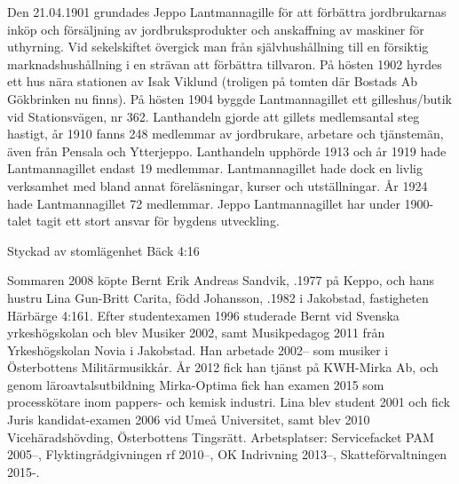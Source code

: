 Den 21.04.1901 grundades Jeppo Lantmannagille för att förbättra jordbrukarnas inköp och försäljning av jordbruksprodukter och anskaffning av maskiner för uthyrning. Vid sekelskiftet övergick man från självhushållning till en försiktig marknadshushållning i en strävan att förbättra tillvaron. På hösten 1902 hyrdes ett hus nära stationen av Isak Viklund	(troligen på tomten där Bostads Ab Gökbrinken nu finns). På hösten 1904 byggde Lantmannagillet ett gilleshus/butik vid Stationsvägen, nr 362. Lanthandeln gjorde att gillets medlemsantal steg hastigt, år 1910 fanns	248 medlemmar av jordbrukare, arbetare och tjänstemän, även från 	Pensala och Ytterjeppo. Lanthandeln upphörde 1913 och år 1919 hade 	Lantmannagillet endast 19 medlemmar. Lantmannagillet hade dock en livlig verksamhet med bland annat föreläsningar, kurser och 	utställningar. År 1924 hade Lantmannagillet 72 medlemmar. Jeppo	Lantmannagillet har under 1900-talet tagit ett stort ansvar för bygdens utveckling.




Styckad av stomlägenhet Bäck 4:16


Sommaren 2008 köpte Bernt Erik Andreas Sandvik, .1977 på Keppo, och hans hustru Lina Gun-Britt Carita, född Johansson, .1982 i Jakobstad, fastigheten Härbärge 4:161. Efter studentexamen 1996 studerade Bernt vid Svenska yrkeshögskolan och blev Musiker 2002, samt Musikpedagog 2011 från Yrkeshögskolan Novia i Jakobstad. Han arbetade 2002-- som musiker i Österbottens Militärmusikkår. År 2012 fick han tjänst på KWH-Mirka Ab, och genom 	läroavtalsutbildning Mirka-Optima fick han examen 2015 som processkötare inom pappers- och kemisk industri. Lina blev student 2001 och fick Juris kandidat-examen 2006 vid Umeå Universitet, samt	blev 2010 Vicehäradshövding, Österbottens Tingsrätt. Arbetsplatser: Servicefacket PAM 2005--, Flyktingrådgivningen rf 2010--, OK Indrivning 2013--, Skatteförvaltningen 2015-.
\begin{jhchildren}
  \item {}
  \item {}
  \item {}
  \item {}
\end{jhchildren}


